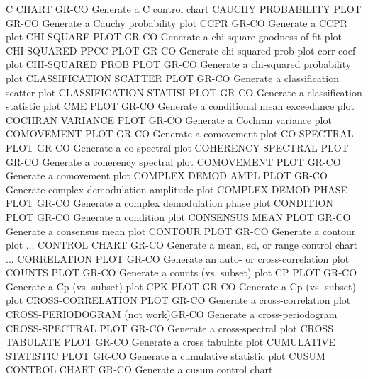 C CHART                     GR-CO Generate a C control chart
CAUCHY PROBABILITY PLOT     GR-CO Generate a Cauchy probability plot
CCPR                        GR-CO Generate a CCPR plot 
CHI-SQUARE PLOT             GR-CO Generate a chi-square goodness of fit plot
CHI-SQUARED PPCC PLOT       GR-CO Generate chi-squared prob plot corr coef plot
CHI-SQUARED PROB PLOT       GR-CO Generate a chi-squared probability plot
CLASSIFICATION SCATTER PLOT GR-CO Generate a classification scatter plot
CLASSIFICATION STATISI PLOT GR-CO Generate a classification statistic plot
CME PLOT                    GR-CO Generate a conditional mean exceedance plot
COCHRAN VARIANCE PLOT       GR-CO Generate a Cochran variance plot
COMOVEMENT PLOT             GR-CO Generate a comovement plot
CO-SPECTRAL PLOT            GR-CO Generate a co-spectral plot
COHERENCY SPECTRAL PLOT     GR-CO Generate a coherency spectral plot
COMOVEMENT PLOT             GR-CO Generate a comovement plot
COMPLEX DEMOD AMPL PLOT     GR-CO Generate complex demodulation amplitude plot
COMPLEX DEMOD PHASE PLOT    GR-CO Generate a complex demodulation phase plot
CONDITION PLOT              GR-CO Generate a condition plot
CONSENSUS MEAN PLOT         GR-CO Generate a consensus mean plot
CONTOUR PLOT                GR-CO Generate a contour plot
... CONTROL CHART           GR-CO Generate a mean, sd, or range control chart
... CORRELATION PLOT        GR-CO Generate an auto- or cross-correlation plot
COUNTS PLOT                 GR-CO Generate a counts (vs. subset) plot
CP PLOT                     GR-CO Generate a Cp (vs. subset) plot
CPK PLOT                    GR-CO Generate a Cp (vs. subset) plot
CROSS-CORRELATION PLOT      GR-CO Generate a cross-correlation plot
CROSS-PERIODOGRAM (not work)GR-CO Generate a cross-periodogram
CROSS-SPECTRAL PLOT         GR-CO Generate a cross-spectral plot
CROSS TABULATE PLOT         GR-CO Generate a cross tabulate plot
CUMULATIVE STATISTIC PLOT   GR-CO Generate a cumulative statistic plot
CUSUM CONTROL CHART         GR-CO Generate a cusum control chart


